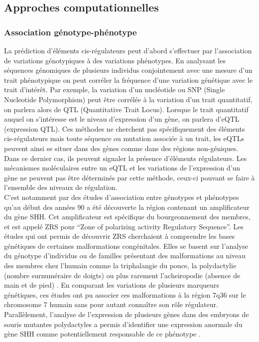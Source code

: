 \newpage
\subsection{Approches computationnelles}
\label{subsec:approch-comput}

\subsubsection{Association génotype-phénotype}
\label{subsubsec:geno-pheno}

La prédiction d’éléments \gls{cis}-régulateurs peut d'abord s'effectuer par l’association de variations génotypiques à des variations phénotypes. En analysant les séquences génomiques de plusieurs individus conjointement avec une mesure d’un trait phénotypique on peut corréler la fréquence d’une variation génétique avec le trait d'intérêt. Par exemple, la variation d’un nucléotide ou SNP (Single Nucleotide Polymorphism) peut être corrélée à la variation d’un trait quantitatif, on parlera alors de QTL (Quantitative Trait Locus). Lorsque le trait quantitatif auquel on s’intéresse est le niveau d’expression d’un gène, on parlera d’eQTL (expression QTL). Ces méthodes ne cherchent pas spécifiquement des éléments \gls{cis}-régulateurs mais toute séquence ou mutation associée à un trait, les eQTLs peuvent ainsi se situer dans des gènes comme dans des régions non-géniques. Dans ce dernier cas, ils peuvent signaler la présence d'éléments régulateurs. Les mécanismes moléculaires entre un eQTL et les variations de l’expression d’un gène ne peuvent pas être déterminés par cette méthode, ceux-ci pouvant se faire à l’ensemble des niveaux de régulation. \\

C’est notamment par des études d’association entre génotypes et phénotypes qu’au début des années 90 a été découverte la région contenant un \gls{amplificateur} du gène \acrshort{SHH}. Cet \gls{amplificateur} est spécifique du bourgeonnement des membres, et est appelé \acrshort{ZRS} pour “Zone of polarizing activity Regulatory Sequence”. Les études qui ont permis de découvrir \acrshort{ZRS} cherchaient à comprendre les bases génétiques de certaines malformations congénitales. Elles se basent sur l’analyse du génotype d’individus ou de familles présentant des malformations au niveau des membres chez l’humain comme la triphalangie du pouce, la polydactylie (nombre surnuméraire de doigts) ou plus rarement l’acheiropodie (absence de main et de pied) \citep{hing_linkage_1995, zguricas_clinical_1999}. En comparant les variations de plusieurs marqueurs génétiques, ces études ont pu associer ces malformations à la région 7q36 sur le chromosome 7 humain sans pour autant connaître son rôle régulateur. Parallèlement, l’analyse de l’expression de plusieurs gènes dans des embryons de souris mutantes polydactyles a permis d’identifier une expression anormale du gène \acrshort{SHH} comme potentiellement responsable de ce phénotype \citep{sharpe_identification_1999}. \\


